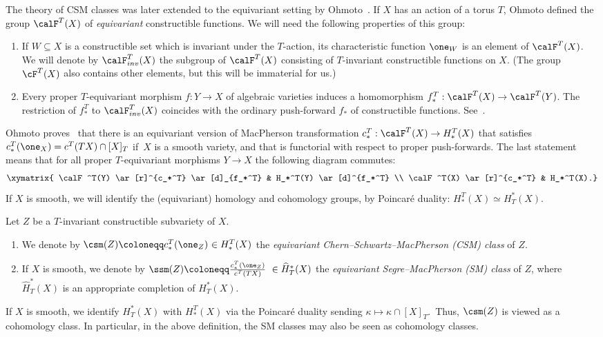 The theory of CSM classes was later extended to the equivariant setting by Ohmoto~\cite{ohmoto:eqcsm}. If $X$ has an 
action of a torus $T$, Ohmoto defined the group $\calF^T(X)$ of {\em equivariant\/} constructible functions. 
We will need the following properties of this group: 
\begin{enumerate} 
	\item If $W \subseteq X$ is a constructible set which is invariant under the $T$-action, its characteristic function $\one_W$ is an element of $\calF^T(X)$. We will denote by $\calF_{inv}^{T}(X)$ the subgroup of $\calF^{T}(X)$ consisting of $T$-invariant constructible functions on $X$. (The group $\cF^T(X)$ also contains other elements, but this will be immaterial for us.)
	\item Every proper $T$-equivariant morphism $f: Y \to X$ of algebraic varieties induces a homomorphism $f_*^T: \calF^T(X) \to \calF^T(Y)$. The restriction of $f_*^T$ to $\calF_{inv}^{T}(X)$ coincides with the ordinary push-forward $f_*$ of constructible functions. See~\cite[\S 2.6]{ohmoto:eqcsm}.
\end{enumerate}

Ohmoto proves~\cite[Theorem 1.1]{ohmoto:eqcsm} that there is an equivariant version of MacPherson transformation $c_*^T: \calF^T(X) \to H_*^T(X)$ that satisfies $c_*^T(\one_X) = c^T(TX) \cap [X]_T$ if~$X$ is a smooth variety, and that is functorial with respect to proper push-forwards. The last statement means that for all proper $T$-equivariant morphisms $Y\to X$ the following diagram
commutes:
$$\xymatrix{ 
	\calF^T(Y) \ar[r]^{c_*^T} \ar[d]_{f_*^T} & H_*^T(Y) \ar[d]^{f_*^T} \\ 
	\calF^T(X) \ar[r]^{c_*^T} & H_*^T(X).}$$ 
If $X$ is smooth, we will identify the (equivariant) homology and cohomology groups, 
by Poincar{\'e} duality: $H_*^T(X)\simeq H^*_T(X)$.


\begin{defin}
	Let $Z$ be a $T$-invariant constructible subvariety of $X$. 
	\begin{enumerate}
		\item
		We denote by $\csm(Z)\coloneqq c_*^T(\one_{Z}) {~\in H_*^T(X)}$ the {\em equivariant Chern--Schwartz--MacPherson (CSM) class\/} of $Z$. 
		\item 
		If $X$ is smooth, we denote by $\ssm(Z)\coloneqq \frac{c_*^T(\one_{Z})}{c^T(T X)} ~\in \widehat{H}^*_T(X)$ 
		the {\em equivariant Segre--MacPherson (SM) class\/} of $Z$, where $\widehat{H}^*_T(X)$ is an appropriate completion
		of $H^*_T(X)$. 
	\end{enumerate}
\end{defin}
If $X$ is smooth,
we identify $H^*_T(X)$ with $H_*^T(X)$ via the Poincar\'e duality sending $\kappa \mapsto \kappa \cap [X]_T$.~Thus, $\csm(Z)$ is viewed as a cohomology class. In particular, in the above definition, the SM classes may also be seen as cohomology classes.
	

